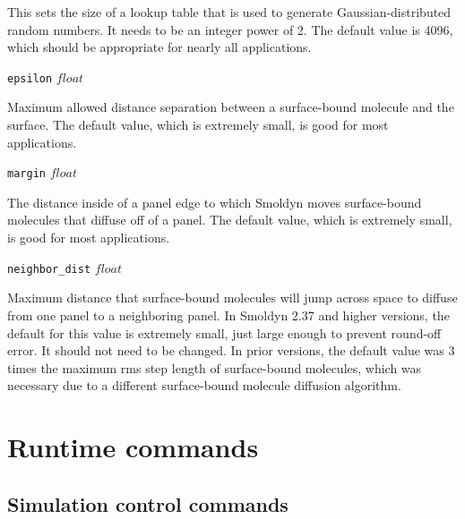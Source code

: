 \documentclass {scrbook}
\newcommand {\ttt} {\texttt}
\begin{document}
\begin{description}
This sets the size of a lookup table that is used to generate Gaussian-distributed random numbers. It needs to be an integer power of 2. The default value is 4096, which should be appropriate for nearly all applications.

\item{\ttt{epsilon} $float$}

Maximum allowed distance separation between a surface-bound molecule and the surface. The default value, which is extremely small, is good for most applications.

\item{\ttt{margin} $float$}

The distance inside of a panel edge to which Smoldyn moves surface-bound molecules that diffuse off of a panel. The default value, which is extremely small, is good for most applications.

\item{\ttt{neighbor\_dist} $float$}

Maximum distance that surface-bound molecules will jump across space to diffuse from one panel to a neighboring panel. In Smoldyn 2.37 and higher versions, the default for this value is extremely small, just large enough to prevent round-off error. It should not need to be changed. In prior versions, the default value was 3 times the maximum rms step length of surface-bound molecules, which was necessary due to a different surface-bound molecule diffusion algorithm.

\end{description}



\chapter{Runtime commands}

\section{Simulation control commands}
\end{document}
